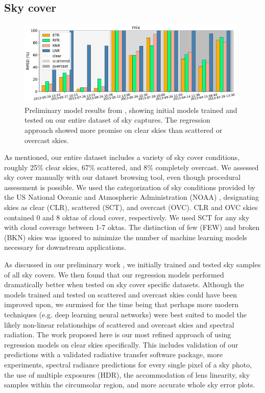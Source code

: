 \subsection{Sky cover}
\label{ssec:skycover}

\begin{figure}[pos=tbp]
\begin{center}
\includegraphics[width=0.98\textwidth]{img/results_prelim_mix.pdf}%
\end{center}
\vspace{-2mm}
\caption[skycover]{Preliminary model results from \cite{delrocco_spie}, showing initial models trained and tested on our entire dataset of sky captures. The regression approach showed more promise on clear skies than scattered or overcast skies.}
\label{fig:skycover}
\end{figure}

As mentioned, our entire dataset includes a variety of sky cover conditions, roughly 25\% clear skies, 67\% scattered, and 8\% completely overcast. We assessed sky cover manually with our dataset browsing tool, even though procedural assessment is possible. We used the categorization of sky conditions provided by the US National Oceanic and Atmospheric Administration (NOAA) \citep{noaa_fmh1chpt9_2017}, designating skies as clear (CLR), scattered (SCT), and overcast (OVC). CLR and OVC skies contained 0 and 8 oktas of cloud cover, respectively. We used SCT for any sky with cloud coverage between 1-7 oktas. The distinction of few (FEW) and broken (BKN) skies was ignored to minimize the number of machine learning models necessary for downstream applications.

As discussed in our preliminary work \citep{delrocco_spie}, we initially trained and tested sky samples of all sky covers. We then found that our regression models performed dramatically better when tested on sky cover specific datasets. Although the models trained and tested on scattered and overcast skies could have been improved upon, we surmised for the time being that perhaps more modern techniques (e.g. deep learning neural networks) were best suited to model the likely non-linear relationships of scattered and overcast skies and spectral radiation. The work proposed here is our most refined approach of using regression models on clear skies specifically. This includes validation of our predictions with a validated radiative transfer software package, more experiments, spectral radiance predictions for every single pixel of a sky photo, the use of multiple exposures (HDR), the accommodation of lens linearity, sky samples within the circumsolar region, and more accurate whole sky error plots.

